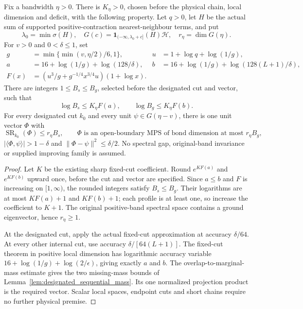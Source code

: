 \begin{theorem}
    \label{thm:ld_sharp_single_witness}
    \leanok
    Fix a bandwidth $\eta>0$. There is $K_\eta>0$, chosen before
    the physical chain, local dimension and deficit, with the following
    property. Let $q>0$, let $H$ be the actual sum of supported
    positive-contraction nearest-neighbour terms, and put
    \[
        \lambda_0=\min\sigma(H),\quad
        G(c)=\mathbf1_{(-\infty,\lambda_0+c]}(H)\mathcal H,\quad
        r_\eta=\dim G(\eta).
    \]
    For $v>0$ and $0<\delta\le1$, set
    \begin{align*}
        g    & =\min\{\min(v,\eta/2)/6,1\},                    &
        u    & =1+\log q+\log(1/g),                              \\
        a    & =16+\log(1/g)+\log(128/\delta),                 &
        b    & =16+\log(1/g)+\log(128(L+1)/\delta),              \\
        F(x) & =\left(u^3/g+g^{-1/4}x^{3/4}u\right)(1+\log x).
    \end{align*}
    There are integers $1\le B_s\le B_g$, selected before the
    designated cut and vector, such that
    \[
        \log B_s\le K_\eta F(a),\qquad
        \log B_g\le K_\eta F(b).
    \]
    For every designated cut $k_0$ and every unit
    $\psi\in G(\eta-v)$, there is one unit vector $\Phi$ with
    \[
        \operatorname{SR}_{k_0}(\Phi)\le r_\eta B_s,\qquad
        \Phi\text{ is an open-boundary MPS of bond dimension at most }r_\eta B_g,
    \]
    $|\langle\Phi,\psi\rangle|>1-\delta$ and
    $\|\Phi-\psi\|^2\le\delta/2$.
    No spectral gap, original-band invariance or supplied improving
    family is assumed.
\end{theorem}
\begin{proof}\leanok
    Let $K$ be the existing sharp fixed-cut coefficient. Round
    $e^{KF(a)}$ and $e^{KF(b)}$ upward once, before the cut and vector
    are specified. Since $a\le b$ and $F$ is increasing on $[1,\infty)$,
    the rounded integers satisfy $B_s\le B_g$.
    Their logarithms are at most $KF(a)+1$ and $KF(b)+1$; each
    profile is at least one, so increase the coefficient to $K+1$.
    The original positive-band spectral space contains a ground
    eigenvector, hence $r_\eta\ge1$.

    At the designated cut, apply the actual fixed-cut approximation at
    accuracy $\delta/64$. At every other internal cut, use accuracy
    $\delta/[64(L+1)]$. The fixed-cut theorem in positive local dimension
    has logarithmic accuracy variable $16+\log(1/g)+\log(2/\epsilon)$,
    giving exactly $a$ and $b$. The overlap-to-marginal-mass estimate
    gives the two missing-mass bounds of
    Lemma~\ref{lem:designated_sequential_mass}. Its one normalized
    projection product is the required vector. Scalar local spaces,
    endpoint cuts and short chains require no further physical premise.
\end{proof}

